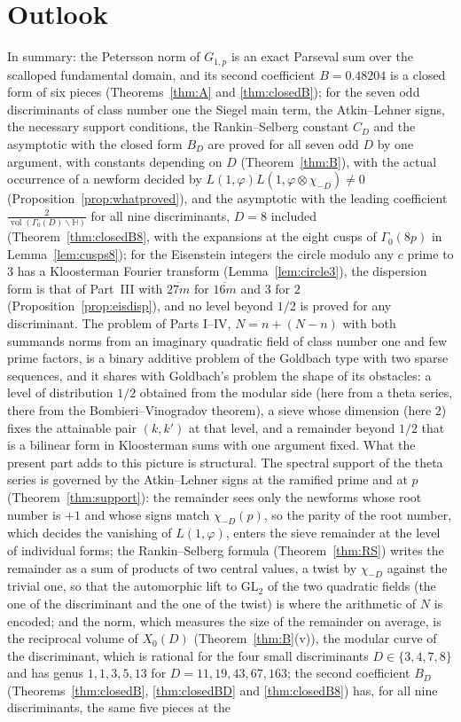 \documentclass[11pt]{amsart}
\theoremstyle{remark}
\newcommand{\HH}{\mathbb{H}}
\DeclareMathOperator{\vol}{vol}
\begin{document}
\section{Outlook}\label{sec:outlook}
In summary: the Petersson norm of $G_{1,p}$ is an exact Parseval sum over the scalloped fundamental domain, and its second coefficient $B=0.48204$ is a closed form of six pieces (Theorems~\ref{thm:A} and \ref{thm:closedB}); for the seven odd discriminants of class number one the Siegel main term, the Atkin--Lehner signs, the necessary support conditions, the Rankin--Selberg constant $C_D$ and the asymptotic with the closed form $B_D$ are proved for all seven odd $D$ by one argument, with constants depending on $D$ (Theorem~\ref{thm:B}), with the actual occurrence of a newform decided by $L(1,\varphi)L(1,\varphi\otimes\chi_{-D})\ne0$ (Proposition~\ref{prop:whatproved}), and the asymptotic with the leading coefficient $\frac2{\vol(\Gamma_0(D)\backslash\HH)}$ for all nine discriminants, $D=8$ included (Theorem~\ref{thm:closedB8}, with the expansions at the eight cusps of $\Gamma_0(8p)$ in Lemma~\ref{lem:cusps8}); for the Eisenstein integers the circle modulo any $c$ prime to $3$ has a Kloosterman Fourier transform (Lemma~\ref{lem:circle3}), the dispersion form is that of Part~III with $\overline{27m}$ for $\overline{16m}$ and $3$ for $2$ (Proposition~\ref{prop:eisdisp}), and no level beyond $1/2$ is proved for any discriminant. The problem of Parts I--IV, $N=n+(N-n)$ with both summands norms from an imaginary quadratic field of class number one and few prime factors, is a binary additive problem of the Goldbach type with two sparse sequences, and it shares with Goldbach's problem the shape of its obstacles: a level of distribution $1/2$ obtained from the modular side (here from a theta series, there from the Bombieri--Vinogradov theorem), a sieve whose dimension (here $2$) fixes the attainable pair $(k,k')$ at that level, and a remainder beyond $1/2$ that is a bilinear form in Kloosterman sums with one argument fixed. What the present part adds to this picture is structural. The spectral support of the theta series is governed by the Atkin--Lehner signs at the ramified prime and at $p$ (Theorem~\ref{thm:support}): the remainder sees only the newforms whose root number is $+1$ and whose signs match $\chi_{-D}(p)$, so the parity of the root number, which decides the vanishing of $L(1,\varphi)$, enters the sieve remainder at the level of individual forms; the Rankin--Selberg formula (Theorem~\ref{thm:RS}) writes the remainder as a sum of products of two central values, a twist by $\chi_{-D}$ against the trivial one, so that the automorphic lift to $\mathrm{GL}_2$ of the two quadratic fields (the one of the discriminant and the one of the twist) is where the arithmetic of $N$ is encoded; and the norm, which measures the size of the remainder on average, is the reciprocal volume of $X_0(D)$ (Theorem~\ref{thm:B}(v)), the modular curve of the discriminant, which is rational for the four small discriminants $D\in\{3,4,7,8\}$ and has genus $1,1,3,5,13$ for $D=11,19,43,67,163$; the second coefficient $B_D$ (Theorems~\ref{thm:closedB}, \ref{thm:closedBD} and \ref{thm:closedB8}) has, for all nine discriminants, the same five pieces at the 
\end{document}

